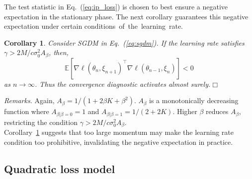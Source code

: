 \documentclass[conference]{IEEEtran}
\newtheorem{corollary}[theorem]{Corollary}
\begin{document}
The test statistic in Eq.~(\ref{eq:ip_loss}) is chosen to best ensure a negative expectation in the stationary phase. 
The next corollary guarantees this negative expectation under certain conditions~of~the~learning~rate.
\begin{corollary}
\label{cor:ip_exp_neg}
Consider SGDM in Eq.~(\ref{eq:sgdm}). If
the learning rate satisfies $\gamma > 2 M / c \sigma_0^2 A_\beta$, then, 
\begin{equation*}
\mathbb{E} [ \nabla \ell ( \theta_n, \xi_{n+1} )^\top \nabla \ell ( \theta_{n-1}, \xi_n ) ] 
< 0
\end{equation*}
as $n \rightarrow \infty$.
Thus the convergence diagnostic activates almost surely.\hfill$\Box$
\end{corollary}
\emph{Remarks.}
Again, $A_\beta =  1 / (1 + 2 \beta K + \beta^2)$.
$A_\beta$ is a monotonically decreasing function where $A_{\beta | \beta=0} = 1$ and $A_{\beta | \beta=1} = 1 / (2 + 2K)$.
Higher $\beta$ reduces $A_\beta$, restricting the condition $\gamma > 2M / c \sigma_0^2 A_\beta$.\\

Corollary~\ref{cor:ip_exp_neg} suggests that too large momentum may make the learning rate condition too prohibitive, invalidating the negative expectation in practice.


\subsection{Quadratic loss model}\label{sec:quadratic}
\end{document}
